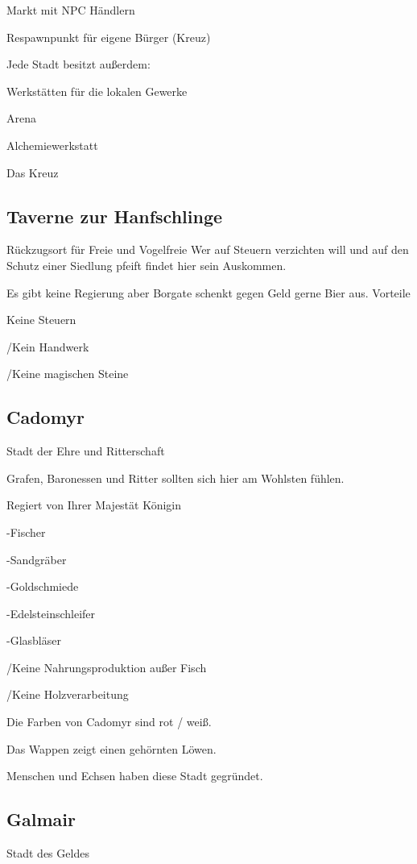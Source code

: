 \documentclass[a4paper,11pt]{book}
\begin{document}
Markt mit NPC Händlern

Respawnpunkt für eigene Bürger (Kreuz)

Jede Stadt besitzt außerdem:

Werkstätten für die lokalen Gewerke

Arena

Alchemiewerkstatt



Das Kreuz

\subsection{Taverne zur Hanfschlinge}

Rückzugsort für Freie und Vogelfreie Wer auf Steuern verzichten will und auf den Schutz einer Siedlung pfeift findet hier sein Auskommen.

Es gibt keine Regierung aber Borgate schenkt gegen Geld gerne Bier aus. Vorteile

Keine Steuern

/Kein Handwerk

/Keine magischen Steine


\subsection{Cadomyr}

Stadt der Ehre und Ritterschaft

Grafen, Baronessen und Ritter sollten sich hier am Wohlsten fühlen.

Regiert von Ihrer Majestät Königin

-Fischer

-Sandgräber

-Goldschmiede

-Edelsteinschleifer

-Glasbläser

/Keine Nahrungsproduktion außer Fisch

/Keine Holzverarbeitung

Die Farben von Cadomyr sind rot / weiß.

Das Wappen zeigt einen gehörnten Löwen.

Menschen und Echsen haben diese Stadt gegründet.

\subsection{Galmair}

Stadt des Geldes
\end{document}

